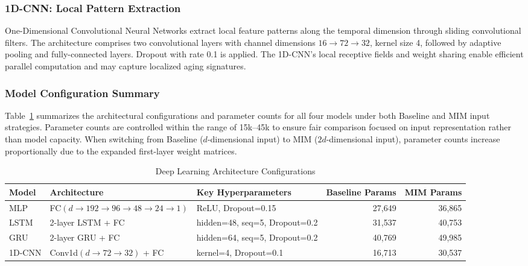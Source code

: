 \documentclass[5p,times]{elsarticle}
\begin{document}
\subsubsection{1D-CNN: Local Pattern Extraction}

One-Dimensional Convolutional Neural Networks extract local feature patterns along the temporal dimension through sliding convolutional filters. The architecture comprises two convolutional layers with channel dimensions $16 \rightarrow 72 \rightarrow 32$, kernel size 4, followed by adaptive pooling and fully-connected layers. Dropout with rate 0.1 is applied. The 1D-CNN's local receptive fields and weight sharing enable efficient parallel computation and may capture localized aging signatures.

\subsubsection{Model Configuration Summary}

Table~\ref{tab:model_config} summarizes the architectural configurations and parameter counts for all four models under both Baseline and MIM input strategies. Parameter counts are controlled within the range of 15k--45k to ensure fair comparison focused on input representation rather than model capacity. When switching from Baseline ($d$-dimensional input) to MIM ($2d$-dimensional input), parameter counts increase proportionally due to the expanded first-layer weight matrices.

\begin{table}[t]
\centering
\small
\caption{Deep Learning Architecture Configurations}
\label{tab:model_config}
\begin{tabular}{@{}llp{4cm}rr@{}}
\toprule
\textbf{Model} & \textbf{Architecture} & \textbf{Key Hyperparameters} & \textbf{Baseline Params} & \textbf{MIM Params} \\
\midrule
MLP & FC$(d \rightarrow 192 \rightarrow 96 \rightarrow 48 \rightarrow 24 \rightarrow 1)$ & ReLU, Dropout=0.15 & 27,649 & 36,865 \\
LSTM & 2-layer LSTM + FC & hidden=48, seq=5, Dropout=0.2 & 31,537 & 40,753 \\
GRU & 2-layer GRU + FC & hidden=64, seq=5, Dropout=0.2 & 40,769 & 49,985 \\
1D-CNN & Conv1d$(d \rightarrow 72 \rightarrow 32)$ + FC & kernel=4, Dropout=0.1 & 16,713 & 30,537 \\
\bottomrule
\end{tabular}
\end{table}
\end{document}
